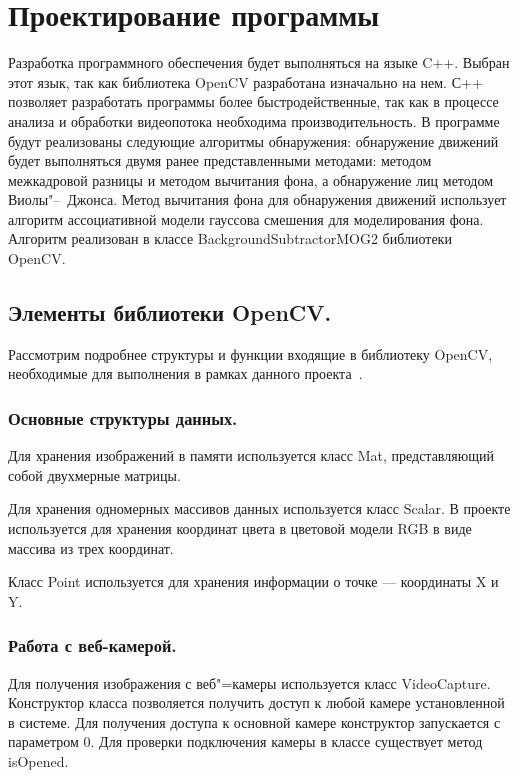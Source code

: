 \section{Проектирование программы} 
\label{sec:program_design}

Разработка программного обеспечения будет выполняться на языке C++. Выбран этот язык, так как библиотека OpenCV разработана изначально на нем. С++ позволяет разработать программы более быстродейственные, так как в процессе анализа и обработки видеопотока необходима производительность. В программе будут реализованы следующие алгоритмы обнаружения: обнаружение движений будет выполняться двумя ранее представленными методами: методом межкадровой разницы и методом вычитания фона, а обнаружение лиц методом Виолы"--~Джонса. Метод вычитания фона для обнаружения движений использует алгоритм ассоциативной модели гауссова смешения для моделирования фона. Алгоритм реализован в классе BackgroundSubtractorMOG2 библиотеки OpenCV.

\subsection{Элементы библиотеки OpenCV.}
\label{sec:program_design:opencv_elements}
Рассмотрим подробнее структуры и функции входящие в библиотеку OpenCV, необходимые для выполнения в рамках данного проекта~\cite{opencvdoc}. 

\subsubsection{Основные структуры данных. }
\label{sec:program_design:opencv_elements:ocv_structs}
Для хранения изображений в памяти используется класс Mat, представляющий собой двухмерные матрицы.

Для хранения одномерных массивов данных используется класс Scalar. В проекте используется для хранения координат цвета в цветовой модели RGB в виде массива из трех координат.

Класс Point используется для хранения информации о точке --- координаты X и Y.

\subsubsection{Работа с веб-камерой. }
\label{sec:program_design:opencv_elements:ocv_webcam}
Для получения изображения с веб"=камеры используется класс VideoCapture. Конструктор класса позволяется получить доступ к любой камере установленной в системе. Для получения доступа к основной камере конструктор запускается с параметром 0.
Для проверки подключения камеры в классе существует метод isOpened.

